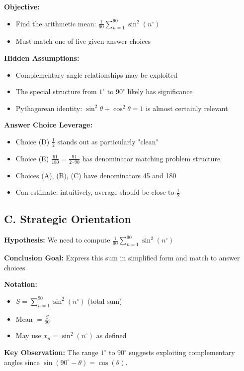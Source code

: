 \documentclass[12pt]{article}
\begin{document}
\begin{problemconfigbox}
\textbf{Objective:}
\begin{itemize}
    \item Find the arithmetic mean: $\displaystyle \frac{1}{90}\sum_{n=1}^{90} \sin^2(n^{\circ})$
    \item Must match one of five given answer choices
\end{itemize}

\textbf{Hidden Assumptions:}
\begin{itemize}
    \item Complementary angle relationships may be exploited
    \item The special structure from $1^{\circ}$ to $90^{\circ}$ likely has significance
    \item Pythagorean identity: $\sin^2\theta + \cos^2\theta = 1$ is almost certainly relevant
\end{itemize}

\textbf{Answer Choice Leverage:}
\begin{itemize}
    \item Choice (D) $\frac{1}{2}$ stands out as particularly "clean"
    \item Choice (E) $\frac{91}{180} = \frac{91}{2 \cdot 90}$ has denominator matching problem structure
    \item Choices (A), (B), (C) have denominators 45 and 180
    \item Can estimate: intuitively, average should be close to $\frac{1}{2}$
\end{itemize}

\subsection*{C. Strategic Orientation}

\textbf{Hypothesis:} 
We need to compute $\displaystyle \frac{1}{90}\sum_{n=1}^{90} \sin^2(n^{\circ})$

\textbf{Conclusion Goal:}
Express this sum in simplified form and match to answer choices

\textbf{Notation:}
\begin{itemize}
    \item $S = \sum_{n=1}^{90} \sin^2(n^{\circ})$ (total sum)
    \item Mean $= \frac{S}{90}$
    \item May use $x_n = \sin^2(n^{\circ})$ as defined
\end{itemize}

\textbf{Key Observation:}
The range $1^{\circ}$ to $90^{\circ}$ suggests exploiting complementary angles since $\sin(90^{\circ} - \theta) = \cos(\theta)$.
\end{problemconfigbox}
\end{document}
